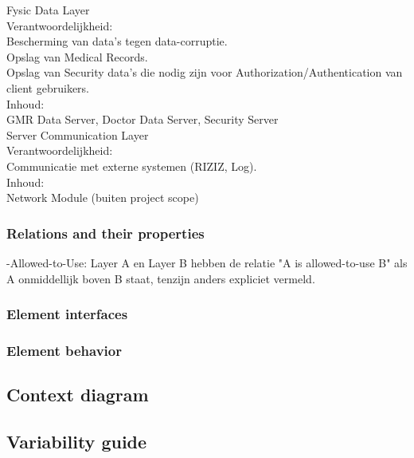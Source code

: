 \documentclass[a4paper,10pt]{article}
\begin{document}
Fysic Data Layer\\

Verantwoordelijkheid:\\
Bescherming van data's tegen data-corruptie.\\
Opslag van Medical Records.\\
Opslag van Security data's die nodig zijn voor Authorization/Authentication van client gebruikers.\\

Inhoud:\\
GMR Data Server, Doctor Data Server, Security Server\\


Server Communication Layer\\

Verantwoordelijkheid:\\
Communicatie met externe systemen (RIZIZ, Log).\\

Inhoud:\\
Network Module (buiten project scope)\\




\subsubsection{Relations and their properties}

-Allowed-to-Use: Layer A en Layer B hebben de relatie "A is allowed-to-use B" als A onmiddellijk boven B staat, tenzijn anders expliciet vermeld.\\

\subsubsection{Element interfaces}

\subsubsection{Element behavior}

\subsection{Context diagram}

\subsection{Variability guide}
\end{document}
